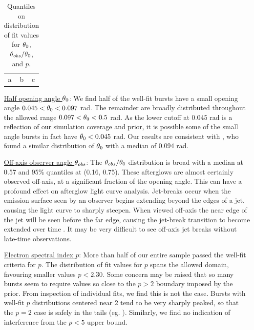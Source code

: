 \begin{table}
\begin{center}
\begin{tabular}{ccc}
a & b & c
\end{tabular}
\end{center}
\caption{Quantiles on distribution of fit values for $\theta_0$, $\theta_{obs} / \theta_0$, and $p$. }
\end{table}



\underline{Half opening angle $\theta_0$}: We find half of the well-fit bursts have a small opening angle $0.045 < \theta_0 < 0.097$ rad.  The remainder are broadly distributed throughout the allowed range $0.097 < \theta_0 < 0.5$ rad.  As the lower cutoff at 0.045 rad is a reflection of our simulation coverage and prior, it is possible some of the small angle bursts in fact have $\theta_0 < 0.045$ rad.  Our results are consistent with \cite{Racusin09}, who found a similar distribution of $\theta_0$ with a median of 0.094 rad.

\underline{Off-axis observer angle $\theta_{obs}$}:  The $\theta_{obs}  / \theta_0$ distribution is broad with a median at 0.57 and 95\% quantiles at (0.16, 0.75).  These afterglows are almost certainly observed off-axis, at a significant fraction of the opening angle.  This can have a profound effect on afterglow light curve analysis.  Jet-breaks occur when the emission surface seen by an observer begins extending beyond the edges of a jet, causing the light curve to sharply steepen.  When viewed off-axis the near edge of the jet will be seen before the far edge, causing the jet-break transition to become extended over time  \citep{vanEer12obs, vanEer13boost}.  It may be very difficult to see off-axis jet breaks without late-time observations.

\underline{Electron spectral index $p$}:  More than half of our entire sample passed the well-fit criteria for $p$.  The distribution of fit values for $p$ spans the allowed domain, favouring smaller values $p < 2.30$.  Some concern may be raised that so many bursts seem to require values so close to the $p>2$ boundary imposed by the prior.  From inspection of individual fits, we find this is not the case.  Bursts with well-fit $p$ distributions centered near 2 tend to be very sharply peaked, so that the $p=2$ case is safely in the tails (eg. ).  Similarly, we find no indication of interference from the $p<5$ upper bound.  

